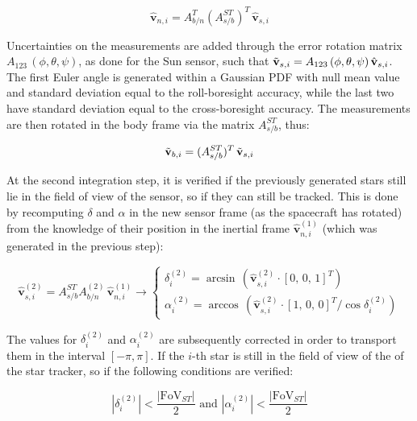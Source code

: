 \begin{equation}
    \hat{\mathbf{v}}_{n,i} = A_{b/n}^T (A_{s/b}^{ST})^T \, \hat{\mathbf{v}}_{s,i}
\end{equation} 

Uncertainties on the measurements are added through the error rotation matrix $A_{123}\,(\phi,\theta,\psi)$, as done for the Sun sensor, such that $\Tilde{\mathbf{v}}_{s,i} = A_{123}\,(\phi, \theta, \psi)\,\hat{\mathbf{v}}_{s,i}$. The first Euler angle is generated within a Gaussian PDF with null mean value and standard deviation equal to the roll-boresight accuracy, while the last two have standard deviation equal to the cross-boresight accuracy. The measurements are then rotated in the body frame via the matrix $A_{s/b}^{ST}$, thus:

\begin{equation}
    \Tilde{\mathbf{v}}_{b,i} = (A_{s/b}^{ST})^T\,\Tilde{\mathbf{v}}_{s,i}
    \label{eq:star_tracker_measurement}
\end{equation}

At the second integration step, it is verified if the previously generated stars still lie in the field of view of the sensor, so if they can still be tracked. This is done by recomputing $\delta$ and $\alpha$ in the new sensor frame (as the spacecraft has rotated) from the knowledge of their position in the inertial frame $\hat{\mathbf{v}}_{n,i}^{(1)}$ (which was generated in the previous step):

\begin{equation}
    \hat{\mathbf{v}}_{s,i}^{(2)} = A_{s/b}^{ST} A_{b/n}^{(2)}\, \hat{\mathbf{v}}_{n,i}^{(1)} \rightarrow 
    \begin{cases}
        \delta_i^{(2)} = \arcsin\,( \hat{\mathbf{v}}_{s,i}^{(2)} \cdot [0,\, 0,\, 1]^T) \\
        \alpha_i^{(2)} = \arccos\,( \hat{\mathbf{v}}_{s,i}^{(2)} \cdot [1,\, 0,\, 0]^T / \cos \delta_i^{(2)} )
    \end{cases}
\end{equation}

The values for $\delta_i^{(2)}$ and $\alpha_i^{(2)}$ are subsequently corrected in order to transport them in the interval $[-\pi, \pi]$. If the $i$-th star is still in the field of view of the of the star tracker, so if the following conditions are verified:

\begin{equation}
    | \delta_i^{(2)} |  < \frac{| \mathrm{FoV}_{ST} |}{2} \text{  and  } | \alpha_i^{(2)} | <  \frac{| \mathrm{FoV}_{ST} |}{2}  
    \label{eq:star_tracker_conditions}
\end{equation}

